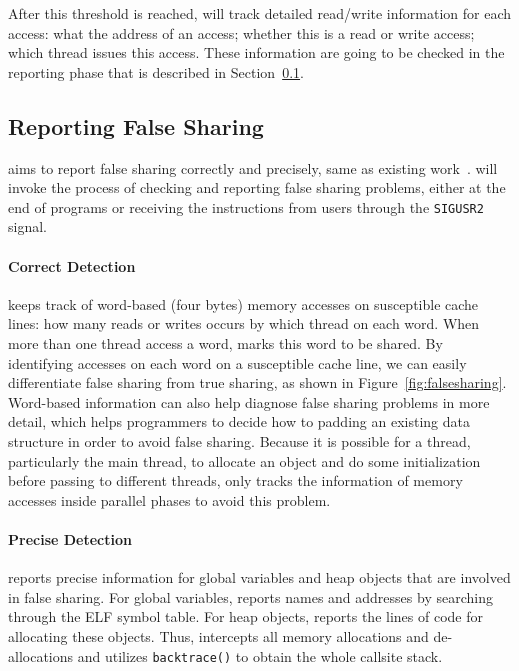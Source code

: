 After this threshold is reached, \Cheetah{} will track detailed read/write information for each access: what the address of an access; whether this is a read or write access; which thread issues this access. These information are going to be checked in the reporting phase that is described in Section~\ref{sec:report}. 

 \subsection{Reporting False Sharing}
\label{sec:report}

\Cheetah{} aims to report false sharing correctly and precisely, same as existing work~\cite{Sheriff, Predator}. \Cheetah{} will invoke the process of checking and reporting false sharing problems, either at the end of programs or receiving the instructions from users through the \texttt{SIGUSR2} signal.  

\paragraph{Correct Detection} \Cheetah{} keeps track of word-based (four bytes) memory accesses on susceptible cache lines: how many reads or writes occurs by which thread on each word. When more than one thread access a word, \Cheetah{} marks this word to be shared. By identifying accesses on each word on a susceptible cache line, we can easily differentiate false sharing from true sharing, as shown in Figure~\ref{fig:falsesharing}. Word-based information can also help diagnose false sharing problems in more detail, which helps programmers to decide how to padding an existing data structure in order to avoid false sharing. Because it is possible for a thread, particularly the main thread, to allocate an object and do some initialization before passing to different threads,  \cheetah{} only tracks the information of memory accesses inside parallel phases to avoid this problem.

\paragraph{Precise Detection} \Cheetah{} reports precise information for global variables and heap objects that are involved in false sharing. For global variables, \Cheetah{} reports names and addresses by searching through the ELF symbol table. For heap objects, \Cheetah{} reports the lines of code for allocating these objects.  
Thus, \Cheetah{} intercepts all memory allocations and de-allocations and utilizes \texttt{backtrace()} to obtain the whole callsite stack. 

